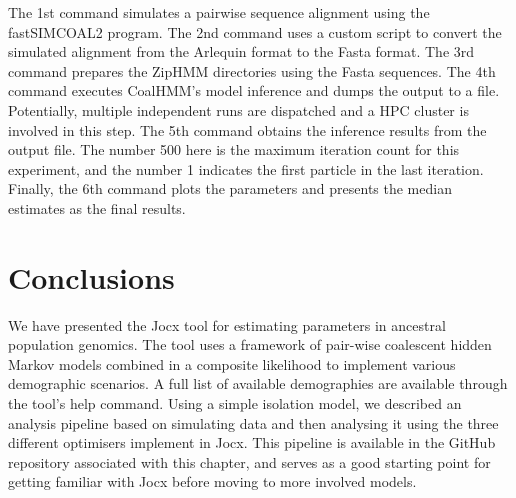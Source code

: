 \documentclass[graybox]{svmult}
\begin{document}
The 1st command simulates a pairwise sequence alignment using the fastSIMCOAL2 program.  The 2nd command uses a custom script to convert the simulated alignment from the Arlequin format to the Fasta format.  The 3rd command prepares the ZipHMM directories using the Fasta sequences.  The 4th command executes CoalHMM's model inference and dumps the output to a file.  Potentially, multiple independent runs are dispatched and a HPC cluster is involved in this step.  The 5th command obtains the inference results from the output file.  The number 500 here is the maximum iteration count for this experiment, and the number 1 indicates the first particle in the last iteration.  Finally, the 6th command plots the parameters and presents the median estimates as the final results.

\section{Conclusions}

We have presented the Jocx tool for estimating parameters in ancestral population genomics. The tool uses a framework of pair-wise coalescent hidden Markov models combined in a composite likelihood to implement various demographic scenarios. A full list of available demographies are available through the tool's help command. Using a simple isolation model, we described an analysis pipeline based on simulating data and then analysing it using the three different optimisers implement in Jocx. This pipeline is available in the GitHub repository associated with this chapter, and serves as a good starting point for getting familiar with Jocx before moving to more involved models.




\end{document}
